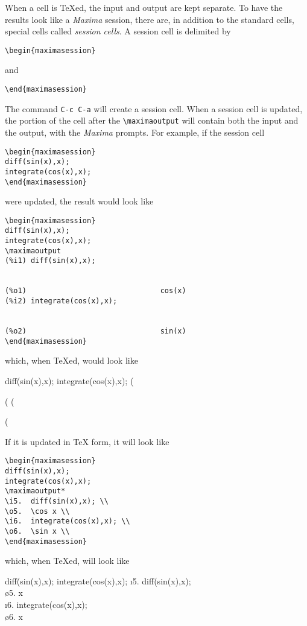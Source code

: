 \documentclass{article}
\newcommand{\mx}{\textsl{\sffamily Maxima}}
\begin{document}
\noindent
When a cell is \TeX{}ed, the input and output are kept separate.  To
have the results look like a \mx{} session, there are, in addition to
the standard cells, special cells called \emph{session cells}.   A
session cell is delimited by
\begin{verbatim}
\begin{maximasession}
\end{verbatim}
\noindent
and
\begin{verbatim}
\end{maximasession}
\end{verbatim}
\noindent
The command \texttt{C-c C-a} will create a session cell.  When a
session cell is updated, the portion of the cell after the
\verb+\maximaoutput+  will contain both the input and the output,
with the \mx{} prompts.  For example, if the session cell
\begin{verbatim}
\begin{maximasession}
diff(sin(x),x);
integrate(cos(x),x);
\end{maximasession}
\end{verbatim}
\noindent
were updated, the result would look like
\begin{verbatim}
\begin{maximasession}
diff(sin(x),x);
integrate(cos(x),x);
\maximaoutput
(%i1) diff(sin(x),x);


(%o1)                               cos(x)
(%i2) integrate(cos(x),x);


(%o2)                               sin(x)
\end{maximasession}
\end{verbatim}
\noindent
which, when \TeX{}ed, would look like
\begin{maximasession}
diff(sin(x),x);
integrate(cos(x),x);
\maximaoutput
(%


(%
(%


(%
\end{maximasession}
\noindent
If it is updated in \TeX{} form, it will look like
\begin{verbatim}
\begin{maximasession}
diff(sin(x),x);
integrate(cos(x),x);
\maximaoutput*
\i5.  diff(sin(x),x); \\
\o5.  \cos x \\
\i6.  integrate(cos(x),x); \\
\o6.  \sin x \\
\end{maximasession}
\end{verbatim}
\noindent
which, when \TeX{}ed, will look like
\begin{maximasession}
diff(sin(x),x);
integrate(cos(x),x);
\maximaoutput*
\i5.  diff(sin(x),x); \\
\o5.  \cos x \\
\i6.  integrate(cos(x),x); \\
\o6.  \sin x \\
\end{maximasession}
\end{document}
